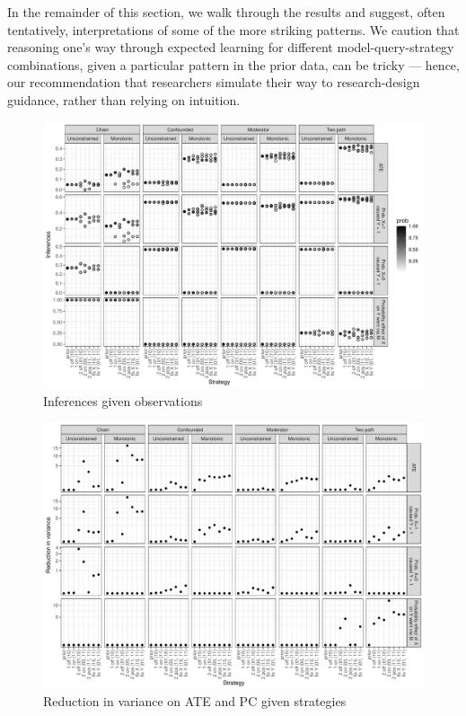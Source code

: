 \documentclass[
  12pt,
]{book}
\begin{document}
In the remainder of this section, we walk through the results and suggest, often tentatively, interpretations of some of the more striking patterns. We caution that reasoning one's way through expected learning for different model-query-strategy combinations, given a particular pattern in the prior data, can be tricky --- hence, our recommendation that researchers simulate their way to research-design guidance, rather than relying on intuition.

\begin{figure}
\centering
\includegraphics{ii_files/figure-latex/caseselectionest-1.pdf}
\caption{\label{fig:caseselectionest}Inferences given observations}
\end{figure}

\begin{figure}
\centering
\includegraphics{ii_files/figure-latex/caseselectionvar-1.pdf}
\caption{\label{fig:caseselectionvar}Reduction in variance on ATE and PC given strategies}
\end{figure}
\end{document}
